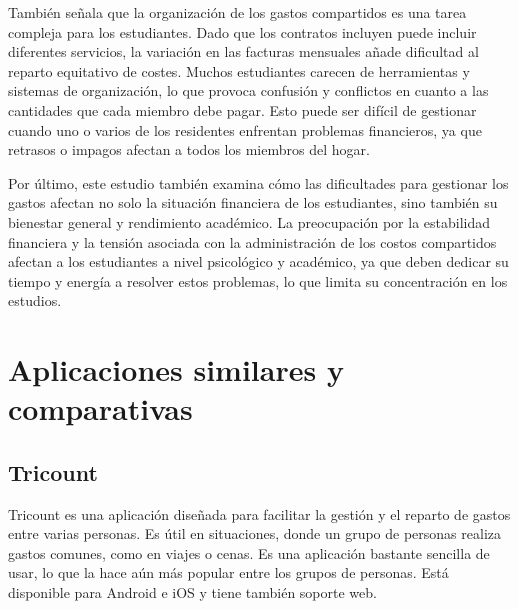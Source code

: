 También señala que la organización de los gastos compartidos es una tarea compleja para los estudiantes. Dado que los contratos incluyen puede incluir 
diferentes servicios, la variación en las facturas mensuales añade dificultad al reparto equitativo de costes. Muchos estudiantes carecen de herramientas 
y sistemas de organización, lo que provoca confusión y conflictos en cuanto a las cantidades que cada miembro debe pagar. Esto puede ser 
difícil de gestionar cuando uno o varios de los residentes enfrentan problemas financieros, ya que retrasos o impagos afectan a todos los miembros del hogar.

Por último, este estudio también examina cómo las dificultades para gestionar los gastos afectan no solo la situación financiera de los estudiantes, 
sino también su bienestar general y rendimiento académico. La preocupación por la estabilidad financiera y la tensión asociada con la administración de los 
costos compartidos afectan a los estudiantes a nivel psicológico y académico, ya que deben dedicar su tiempo y energía a resolver estos problemas, lo que limita 
su concentración en los estudios. 
\newpage

\section{Aplicaciones similares y comparativas}
\label{sec:aplicaciones}

\subsection{Tricount}
\label{subsec:tricount}

Tricount es una aplicación diseñada para facilitar la gestión y el reparto de gastos entre varias personas. Es útil en situaciones,
donde un grupo de personas realiza gastos comunes, como en viajes o cenas. Es una aplicación bastante sencilla de usar, lo que la 
hace aún más popular entre los grupos de personas. Está disponible para Android e iOS y tiene también soporte web. \cite{tricount2025} 

